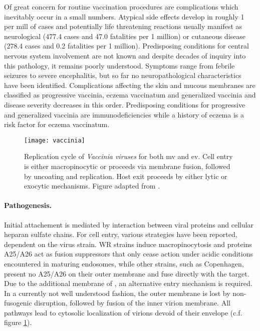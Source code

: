Of great concern for routine vaccination procedures are complications which inevitably occur in a small numbers. Atypical side effects develop in roughly 1 per mill of cases and potentially life threatening reactions usually manifest as neurological (477.4 cases and 47.0 fatalities per 1 million) or cutaneous disease (278.4 cases and 0.2 fatalities per 1 million). Predisposing conditions for central nervous system involvement are not known and despite decades of inquiry into this pathology, it remains poorly understood. Symptoms range from febrile seizures to severe encephalitis, but so far no  neuropathological characteristics have been identified. Complications affecting the skin and mucous membranes are classified as progressive vaccinia, eczema vaccinatum and generalized vaccinia and disease severity decreases in this order. Predisposing conditions for progressive and generalized vaccinia are immunodeficiencies while a history of eczema is a risk factor for eczema vaccinatum.

\begin{figure}[t]
  \centering
  \texttt{[image: vaccinia]}
  \caption[Replication cycle of \textit{Vaccinia viruses} for both intracellular mature and extracellular enveloped virions.]{Replication cycle of \textit{Vaccinia viruses} for both \acrfull{mv} and \acrfull{ev}. Cell entry is either macropinocytic or proceeds via membrane fusion, followed by uncoating and replication. Host exit proceeds by either lytic or exocytic mechanisms. Figure adapted from \citet{Hulo2011}.}
  \label{fig:vaccinia}
\end{figure}

\paragraph{Pathogenesis.}
Initial attachement is mediated by interaction between viral proteins and cellular heparan sulfate chains. For cell entry, various strategies have been reported, dependent on the virus strain. WR strains induce macro\-pinocytosis and proteins A25\slash A26 act as fusion suppressors that only cease action under acidic conditions encountered in maturing endosomes, while other strains, such as Copenhagen, present no A25\slash A26 on their outer membrane and fuse directly with the target. Due to the additional membrane of , an alternative entry mechanism is required. In a currently not well understood fashion, the outer membrane is lost by non-fusogenic disruption, followed by fusion of the inner virion membrane. All pathways lead to cytosolic localization of virions devoid of their envelope (c.f. figure \ref{fig:vaccinia}).

